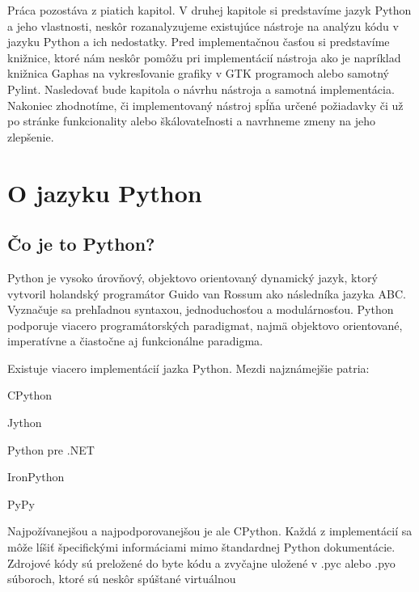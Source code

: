 \documentclass[11pt,oneside,final]{fithesis2}
\begin{document}
	Práca pozostáva z piatich kapitol. V druhej kapitole si predstavíme jazyk Python a jeho vlastnosti, neskôr rozanalyzujeme existujúce nástroje na analýzu kódu v jazyku Python a ich nedostatky. Pred implementačnou časťou si predstavíme knižnice, ktoré nám neskôr pomôžu pri implementácií nástroja ako je napríklad knižnica Gaphas na vykresľovanie grafiky v GTK programoch alebo samotný Pylint. Nasledovať bude kapitola o návrhu nástroja a samotná implementácia. Nakoniec zhodnotíme, či implementovaný nástroj spĺňa určené požiadavky či už po stránke funkcionality alebo škálovateľnosti a navrhneme zmeny na jeho zlepšenie.
 


%
%
%

\chapter{O jazyku Python}

	\section{Čo je to Python?}
	Python je vysoko úrovňový, objektovo orientovaný dynamický jazyk, ktorý vytvoril holandský programátor Guido van Rossum ako následníka jazyka ABC.
Vyznačuje sa prehľadnou syntaxou, jednoduchosťou a modulárnosťou. Python podporuje viacero programátorských paradigmat, najmä objektovo orientované, imperatívne a čiastočne aj funkcionálne paradigma.

Existuje viacero implementácií jazka Python. Mezdi najznámejšie patria:
\begin{list}{•}{}
\item CPython
\item Jython
\item Python pre .NET
\item IronPython
\item PyPy
\end{list}

Najpožívanejšou a najpodporovanejšou je ale CPython. Každá z implementácií sa môže líšiť špecifickými informáciami mimo štandardnej Python dokumentácie.
Zdrojové kódy sú preložené do byte kódu a zvyčajne uložené v .pyc alebo .pyo súboroch, ktoré sú neskôr spúštané virtuálnou
\end{document}

